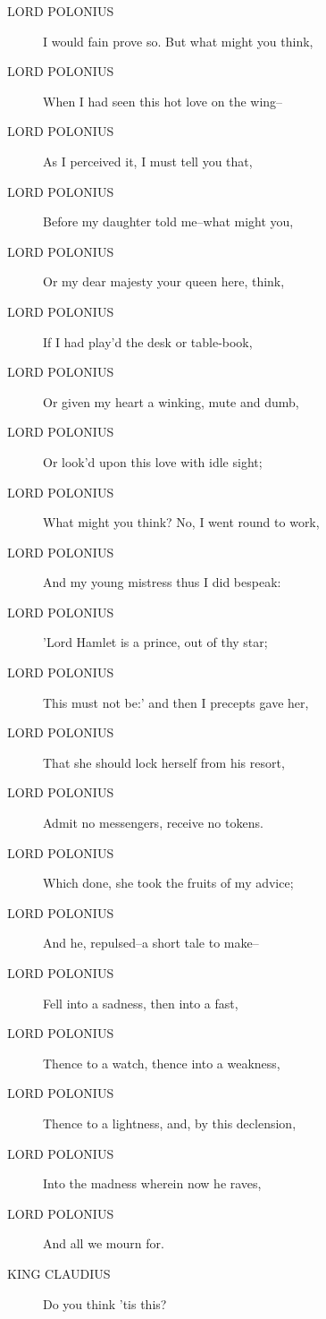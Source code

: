 \documentclass{article}
\begin{document}
\begin{description}
            
\item[LORD POLONIUS] I would fain prove so. But what might you think,
\item[LORD POLONIUS] When I had seen this hot love on the wing--
\item[LORD POLONIUS] As I perceived it, I must tell you that,
\item[LORD POLONIUS] Before my daughter told me--what might you,
\item[LORD POLONIUS] Or my dear majesty your queen here, think,
\item[LORD POLONIUS] If I had play'd the desk or table-book,
\item[LORD POLONIUS] Or given my heart a winking, mute and dumb,
\item[LORD POLONIUS] Or look'd upon this love with idle sight;
\item[LORD POLONIUS] What might you think? No, I went round to work,
\item[LORD POLONIUS] And my young mistress thus I did bespeak:
\item[LORD POLONIUS] 'Lord Hamlet is a prince, out of thy star;
\item[LORD POLONIUS] This must not be:' and then I precepts gave her,
\item[LORD POLONIUS] That she should lock herself from his resort,
\item[LORD POLONIUS] Admit no messengers, receive no tokens.
\item[LORD POLONIUS] Which done, she took the fruits of my advice;
\item[LORD POLONIUS] And he, repulsed--a short tale to make--
\item[LORD POLONIUS] Fell into a sadness, then into a fast,
\item[LORD POLONIUS] Thence to a watch, thence into a weakness,
\item[LORD POLONIUS] Thence to a lightness, and, by this declension,
\item[LORD POLONIUS] Into the madness wherein now he raves,
\item[LORD POLONIUS] And all we mourn for.
\end{description}
          
\begin{description}
            
\item[KING CLAUDIUS] Do you think 'tis this?
\end{description}
          
\end{document}
